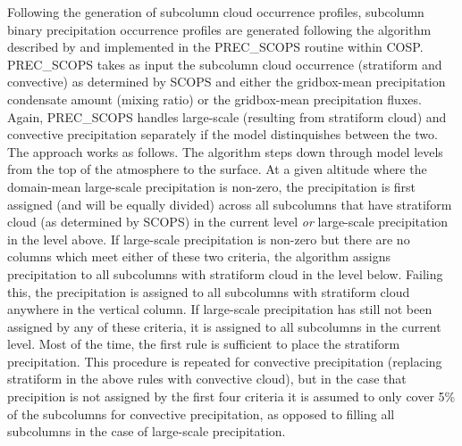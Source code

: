 Following the generation of subcolumn cloud occurrence profiles,
subcolumn binary precipitation occurrence profiles are generated
following the algorithm described by \citet{zhang_et_al_2010} and
implemented in the PREC\_SCOPS routine within COSP. PREC\_SCOPS takes as
input the subcolumn cloud occurrence (stratiform and convective) as
determined by SCOPS and either the gridbox-mean precipitation condensate
amount (mixing ratio) or the gridbox-mean precipitation fluxes. Again,
PREC\_SCOPS handles large-scale (resulting from stratiform cloud) and
convective precipitation separately if the model distinquishes between
the two. The approach works as follows. The algorithm steps down through
model levels from the top of the atmosphere to the surface. At a given
altitude where the domain-mean large-scale precipitation is non-zero,
the precipitation is first assigned (and will be equally divided) across
all subcolumns that have stratiform cloud (as determined by SCOPS) in
the current level \emph{or} large-scale precipitation in the level
above. If large-scale precipitation is non-zero but there are no columns
which meet either of these two criteria, the algorithm assigns
precipitation to all subcolumns with stratiform cloud in the level
below. Failing this, the precipitation is assigned to all subcolumns
with stratiform cloud anywhere in the vertical column. If large-scale
precipitation has still not been assigned by any of these criteria, it
is assigned to all subcolumns in the current level. Most of the time,
the first rule is sufficient to place the stratiform precipitation. This
procedure is repeated for convective precipitation (replacing stratiform
in the above rules with convective cloud), but in the case that
precipition is not assigned by the first four criteria it is assumed to
only cover 5\% of the subcolumns for convective precipitation, as
opposed to filling all subcolumns in the case of large-scale
precipitation.

